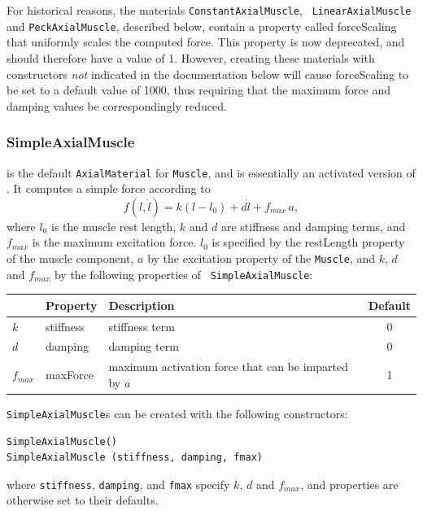 \begin{sideblock}
For historical reasons, the materials {\tt ConstantAxialMuscle}, {\tt
LinearAxialMuscle} and {\tt PeckAxialMuscle}, described below, contain
a property called {\sf forceScaling} that uniformly scales the
computed force. This property is now deprecated, and should therefore
have a value of 1. However, creating these materials with constructors
{\it not} indicated in the documentation below will cause {\sf
forceScaling} to be set to a default value of 1000, thus requiring
that the maximum force and damping values be correspondingly reduced.
\end{sideblock}

\subsubsection{SimpleAxialMuscle}

 is the default
{\tt AxialMaterial} for {\tt Muscle}, and is essentially an activated
version of .
It computes a simple force according to
%
\begin{equation}
f(l, \dot l) = k (l-l_0) + d \dot l + f_{max} \, a,
\label{SimpleAxialMuscle:eqn}
\end{equation}
%
where $l_0$ is the muscle rest length, $k$ and $d$ are stiffness and
damping terms, and $f_{max}$ is the maximum excitation force. $l_0$ is
specified by the {\sf restLength} property of the muscle component,
$a$ by the {\sf excitation} property of the {\tt Muscle}, and $k$, $d$
and $f_{max}$ by the following properties of {\tt
SimpleAxialMuscle}:

\begin{center}
\begin{tabular}{|l|l|l|c|} 
\hline
 & Property & Description & Default \\
\hline
$k$ & {\sf stiffness} & stiffness term & 0 \\
$d$ & {\sf damping} & damping term & 0 \\
$f_{max}$ & {\sf maxForce} & maximum activation force that can be 
imparted by $a$ & 1 \\
\hline
\end{tabular}
\end{center}

{\tt SimpleAxialMuscle}s can be created with the following
constructors:
\begin{lstlisting}[]
SimpleAxialMuscle()
SimpleAxialMuscle (stiffness, damping, fmax)
\end{lstlisting}
%
where {\tt stiffness}, {\tt damping}, and {\tt fmax} specify $k$, $d$
and $f_{max}$, and properties are otherwise set to their defaults.

